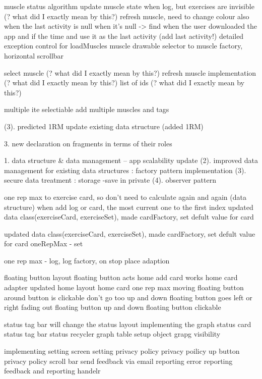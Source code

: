\model
muscle status algorithm
update muscle state when log, but exercises are invisible (? what did I exactly mean by this?)
refresh muscle, need to change colour also when the last activity is null
when it's null -> find when the user downloaded the app and if the time and use it as the last activity (add last activity!)
detailed exception control for loadMuscles
muscle drawable selector to muscle factory, horizontal scrollbar

select muscle (? what did I exactly mean by this?)
refresh muscle implementation (? what did I exactly mean by this?)
list of ids (? what did I exactly mean by this?)

\addCardActivity
    multiple ite selectiable
    add multiple muscles and tags




(3). predicted 1RM
update existing data structure (added 1RM)



3. new declaration on fragments in terms of their roles


1. data structure & data management 
-- app scalability update
(2). improved data management for existing data structures : factory pattern implementation 
(3). secure data treatment : storage -save in private
(4). observer pattern 


one rep max to exercise card, so don't need to calculate again and again (data structure)
when add log or card, the most current one to the first index
updated data class(exerciseCard, exerciseSet), made cardFactory, set defult value for card


updated data class(exerciseCard, exerciseSet), made cardFactory, set defult value for card
oneRepMax - set


one rep max - log, log factory, on stop place adaption


floating button layout 
floating button acts
home add card works
home card adapter updated
home layout
home card one rep max
moving floating button around
button is clickable
don't go too up and down
floating button goes left or right
fading out
floating button up and down
floating button clickable


status tag bar
will change the status layout
implementing the graph
status card
status tag bar
status recycler
graph
table setup object
grapg visibility


implementing setting screen
setting privacy policy
privacy poilicy up button
privacy policy scroll bar
send feedback via email
reporting
error reporting
feedback and reporting handelr


